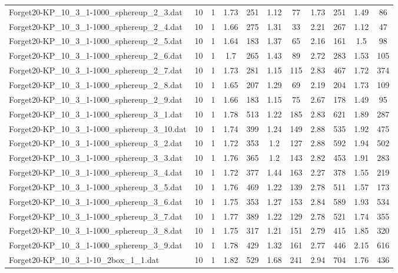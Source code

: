 \begin{table}[!ht]
\begin{tabular}{lcccccccccc}
Forget20-KP\_10\_3\_1-1000\_sphereup\_2\_3.dat & 10 & 1 & 1.73 & 251 & 1.12 & 77 & 1.73 & 251 & 1.49 & 86 \\
Forget20-KP\_10\_3\_1-1000\_sphereup\_2\_4.dat & 10 & 1 & 1.66 & 275 & 1.31 & 33 & 2.21 & 267 & 1.12 & 47 \\
Forget20-KP\_10\_3\_1-1000\_sphereup\_2\_5.dat & 10 & 1 & 1.64 & 183 & 1.37 & 65 & 2.16 & 161 & 1.5 & 98 \\
Forget20-KP\_10\_3\_1-1000\_sphereup\_2\_6.dat & 10 & 1 & 1.7 & 265 & 1.43 & 89 & 2.72 & 283 & 1.53 & 105 \\
Forget20-KP\_10\_3\_1-1000\_sphereup\_2\_7.dat & 10 & 1 & 1.73 & 281 & 1.15 & 115 & 2.83 & 467 & 1.72 & 374 \\
Forget20-KP\_10\_3\_1-1000\_sphereup\_2\_8.dat & 10 & 1 & 1.65 & 207 & 1.29 & 69 & 2.19 & 204 & 1.73 & 109 \\
Forget20-KP\_10\_3\_1-1000\_sphereup\_2\_9.dat & 10 & 1 & 1.66 & 183 & 1.15 & 75 & 2.67 & 178 & 1.49 & 95 \\
Forget20-KP\_10\_3\_1-1000\_sphereup\_3\_1.dat & 10 & 1 & 1.78 & 513 & 1.22 & 185 & 2.83 & 621 & 1.89 & 287 \\
Forget20-KP\_10\_3\_1-1000\_sphereup\_3\_10.dat & 10 & 1 & 1.74 & 399 & 1.24 & 149 & 2.88 & 535 & 1.92 & 475 \\
Forget20-KP\_10\_3\_1-1000\_sphereup\_3\_2.dat & 10 & 1 & 1.72 & 353 & 1.2 & 127 & 2.88 & 592 & 1.94 & 502 \\
Forget20-KP\_10\_3\_1-1000\_sphereup\_3\_3.dat & 10 & 1 & 1.76 & 365 & 1.2 & 143 & 2.82 & 453 & 1.91 & 283 \\
Forget20-KP\_10\_3\_1-1000\_sphereup\_3\_4.dat & 10 & 1 & 1.72 & 377 & 1.44 & 163 & 2.27 & 378 & 1.55 & 219 \\
Forget20-KP\_10\_3\_1-1000\_sphereup\_3\_5.dat & 10 & 1 & 1.76 & 469 & 1.22 & 139 & 2.78 & 511 & 1.57 & 173 \\
Forget20-KP\_10\_3\_1-1000\_sphereup\_3\_6.dat & 10 & 1 & 1.75 & 353 & 1.27 & 153 & 2.84 & 589 & 1.93 & 534 \\
Forget20-KP\_10\_3\_1-1000\_sphereup\_3\_7.dat & 10 & 1 & 1.77 & 389 & 1.22 & 129 & 2.78 & 521 & 1.74 & 355 \\
Forget20-KP\_10\_3\_1-1000\_sphereup\_3\_8.dat & 10 & 1 & 1.75 & 317 & 1.21 & 151 & 2.79 & 415 & 1.85 & 320 \\
Forget20-KP\_10\_3\_1-1000\_sphereup\_3\_9.dat & 10 & 1 & 1.78 & 429 & 1.32 & 161 & 2.77 & 446 & 2.15 & 616 \\
Forget20-KP\_10\_3\_1-10\_2box\_1\_1.dat & 10 & 1 & 1.82 & 529 & 1.68 & 241 & 2.94 & 704 & 1.76 & 436 \\

\end{tabular}
\end{table}
